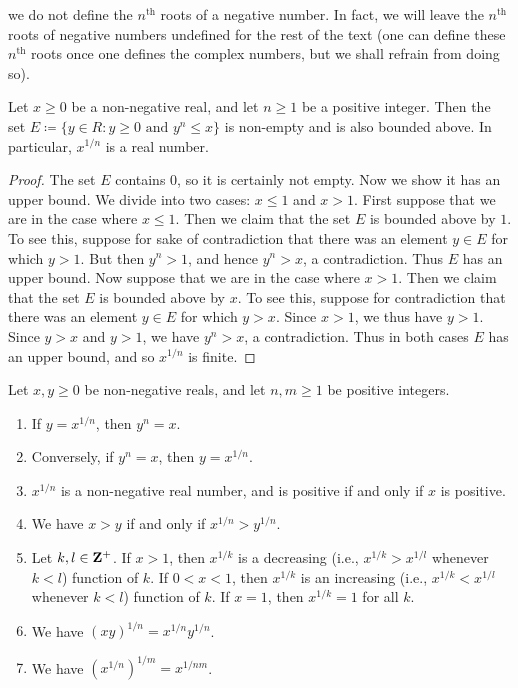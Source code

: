 \begin{note}
  we do not define the \(n^{\text{th}}\) roots of a negative number.
  In fact, we will leave the \(n^{\text{th}}\) roots of negative numbers undefined for the rest of the text
  (one can define these \(n^{\text{th}}\) roots once one defines the complex numbers, but we shall refrain from doing so).
\end{note}

\begin{lemma}\label{5.6.5}
  Let \(x \geq 0\) be a non-negative real, and let \(n \geq 1\) be a positive integer.
  Then the set \(E \coloneqq \{y \in R : y \geq 0 \text{ and } y^n \leq x\}\) is non-empty and is also bounded above.
  In particular, \(x^{1 / n}\) is a real number.
\end{lemma}

\begin{proof}
  The set \(E\) contains \(0\), so it is certainly not empty.
  Now we show it has an upper bound.
  We divide into two cases: \(x \leq 1\) and \(x > 1\).
  First suppose that we are in the case where \(x \leq 1\).
  Then we claim that the set \(E\) is bounded above by \(1\).
  To see this, suppose for sake of contradiction that there was an element \(y \in E\) for which \(y > 1\).
  But then \(y^n > 1\), and hence \(y^n > x\), a contradiction.
  Thus \(E\) has an upper bound.
  Now suppose that we are in the case where \(x > 1\).
  Then we claim that the set \(E\) is bounded above by \(x\).
  To see this, suppose for contradiction that there was an element \(y \in E\) for which \(y > x\).
  Since \(x > 1\), we thus have \(y > 1\).
  Since \(y > x\) and \(y > 1\), we have \(y^n > x\), a contradiction.
  Thus in both cases \(E\) has an upper bound, and so \(x^{1 / n}\) is finite.
\end{proof}

\begin{lemma}\label{5.6.6}
  Let \(x, y \geq 0\) be non-negative reals, and let \(n, m \geq 1\) be positive integers.
  \begin{enumerate}
    \item If \(y = x^{1 / n}\), then \(y^n = x\).
    \item Conversely, if \(y^n = x\), then \(y = x^{1 / n}\).
    \item \(x^{1 / n}\) is a non-negative real number, and is positive if and only if \(x\) is positive.
    \item We have \(x > y\) if and only if \(x^{1 / n} > y^{1 / n}\).
    \item Let \(k, l \in \mathbf{Z}^+\).
          If \(x > 1\), then \(x^{1 / k}\) is a decreasing (i.e., \(x^{1 / k} > x^{1 / l}\) whenever \(k < l\)) function of \(k\).
          If \(0 < x < 1\), then \(x^{1 / k}\) is an increasing (i.e., \(x^{1 / k} < x^{1 / l}\) whenever \(k < l\)) function of \(k\).
          If \(x = 1\), then \(x^{1 / k} = 1\) for all \(k\).
    \item We have \((xy)^{1 / n} = x^{1 / n} y^{1 / n}\).
    \item We have \((x^{1 / n})^{1 / m} = x^{1 / nm}\).
  \end{enumerate}
\end{lemma}

